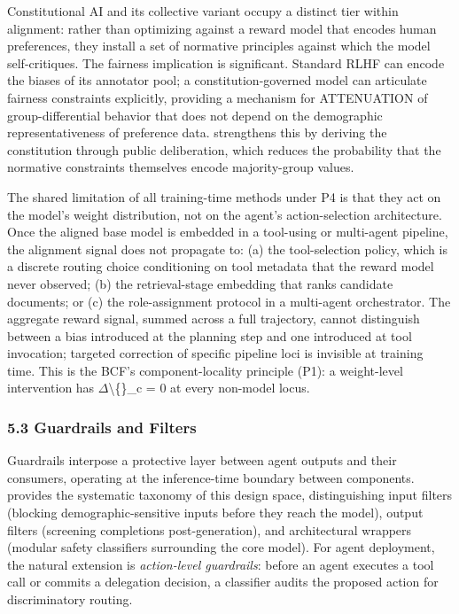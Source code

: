 \documentclass[10pt]{article}
\begin{document}
Constitutional AI \cite{bai2022constitutional} and its collective variant \cite{huang2024collective} occupy a distinct tier within alignment: rather than optimizing against a reward model that encodes human preferences, they install a set of normative principles against which the model self-critiques. The fairness implication is significant. Standard RLHF can encode the biases of its annotator pool; a constitution-governed model can articulate fairness constraints explicitly, providing a mechanism for ATTENUATION of group-differential behavior that does not depend on the demographic representativeness of preference data. \cite{huang2024collective} strengthens this by deriving the constitution through public deliberation, which reduces the probability that the normative constraints themselves encode majority-group values.

The shared limitation of all training-time methods under P4 is that they act on the model's weight distribution, not on the agent's action-selection architecture. Once the aligned base model is embedded in a tool-using or multi-agent pipeline, the alignment signal does not propagate to: (a) the tool-selection policy, which is a discrete routing choice conditioning on tool metadata that the reward model never observed; (b) the retrieval-stage embedding that ranks candidate documents; or (c) the role-assignment protocol in a multi-agent orchestrator. The aggregate reward signal, summed across a full trajectory, cannot distinguish between a bias introduced at the planning step and one introduced at tool invocation; targeted correction of specific pipeline loci is invisible at training time. This is the BCF's component-locality principle (P1): a weight-level intervention has $\Delta$\textbackslash\{\}\_c = 0 at every non-model locus.

\subsubsection*{5.3 Guardrails and Filters}

Guardrails interpose a protective layer between agent outputs and their consumers, operating at the inference-time boundary between components. \cite{dong2024building} provides the systematic taxonomy of this design space, distinguishing input filters (blocking demographic-sensitive inputs before they reach the model), output filters (screening completions post-generation), and architectural wrappers (modular safety classifiers surrounding the core model). For agent deployment, the natural extension is \emph{action-level guardrails}: before an agent executes a tool call or commits a delegation decision, a classifier audits the proposed action for discriminatory routing.
\end{document}
